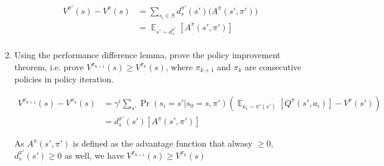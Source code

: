 \documentclass[11pt]{article}
\theoremstyle{case}
\DeclareMathOperator{\E}{\mathbb{E}}
\begin{document}
\begin{enumerate}[label=(\alph*)]
\begin{shaded}
\begin{align*}
V^{\pi'}(s) - V^{\pi}(s) & = \sum_{s_i \in S} d^{\pi'}_s(s')  \big(  A^\pi(s',\pi') \big)\\
										& = \E_{s'\sim d^{\pi'}_s}[A^\pi(s',\pi')]\\
\end{align*}

\end{shaded}

\item Using the performance difference lemma, prove the policy improvement theorem, i.e. prove $V^{\pi_{k+1}}(s) \geq V^{\pi_{k}}(s)$, where $\pi_{k+1}$ and $\pi_{k}$ are consecutive policies in policy iteration.
\begin{shaded}
\begin{align*}
V^{\pi_{k+1}}(s) - V^{\pi_{k}}(s) & =  \gamma^i \sum_{s'}\Pr(s_i=s'|s_0=s, \pi')(\E_{a_i\sim \pi'(s')}[Q^\pi(s',a_i)]-V^\pi(s') )\\
& = d^{\pi'}_s(s') [A^\pi(s',\pi')]
\end{align*}

As $A^\pi(s',\pi')$ is defined as the advantage function that alwasy $\geq 0$, $d^{\pi'}_s(s') \geq 0$ as well, we have $V^{\pi_{k+1}}(s) \geq V^{\pi_{k}}(s)$
\end{shaded}
\end{enumerate}



\newpage
\end{document}
